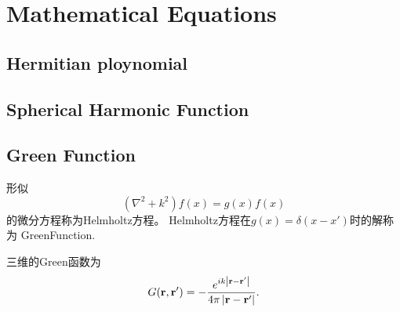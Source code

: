 \chapter{Mathematical Equations}
\section{Hermitian ploynomial}
\label{Hermition_Polynomial}
\section{Spherical Harmonic Function}
\label{SphereHarmonic_Function}
\section{Green Function}
\label{Green_Function}

形似
\begin{equation}
    (\nabla^2+k^2)f(x)=g(x)f(x)
\end{equation}
的微分方程称为Helmholtz方程。 Helmholtz方程在$g(x)=\delta(x-x')$时的解称为 \gls{GreenFunction}.

三维的Green函数为
\begin{equation}
    G(\mathbf{r},\mathbf{r}')=-\frac{e^{ik\left|\mathbf{r}-\mathbf{r}'\right|}}{4\pi\left|\mathbf{r}-\mathbf{r}'\right|}.
\end{equation}

